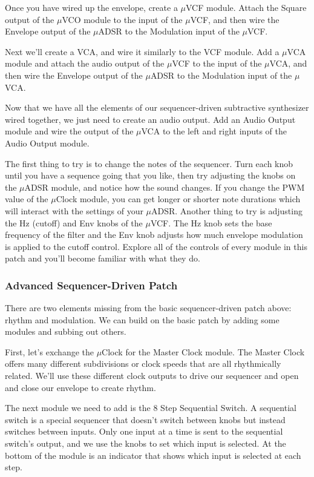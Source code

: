 \documentclass[11pt]{book}
\begin{document}
\begin{multicols*}{2}
Once you have wired up the envelope, create a $\mu$VCF module. Attach the Square output of the $\mu$VCO module to the input of the $\mu$VCF, and then wire the Envelope output of the $\mu$ADSR to the Modulation input of the $\mu$VCF.

Next we'll create a VCA, and wire it similarly to the VCF module. Add a $\mu$VCA module and attach the audio output of the $\mu$VCF to the input of the $\mu$VCA, and then wire the Envelope output of the $\mu$ADSR to the Modulation input of the $\mu$VCA.

Now that we have all the elements of our sequencer-driven subtractive synthesizer wired together, we just need to create an audio output. Add an Audio Output module and wire the output of the $\mu$VCA to the left and right inputs of the Audio Output module.

The first thing to try is to change the notes of the sequencer. Turn each knob until you have a sequence going that you like, then try adjusting the knobs on the $\mu$ADSR module, and notice how the sound changes. If you change the PWM value of the $\mu$Clock module, you can get longer or shorter note durations which will interact with the settings of your $\mu$ADSR. Another thing to try is adjusting the Hz (cutoff) and Env knobs of the $\mu$VCF. The Hz knob sets the base frequency of the filter and the Env knob adjusts how much envelope modulation is applied to the cutoff control. Explore all of the controls of every module in this patch and you'll become familiar with what they do.

\subsubsection{Advanced Sequencer-Driven Patch}

There are two elements missing from the basic sequencer-driven patch above: rhythm and modulation. We can build on the basic patch by adding some modules and subbing out others.

First, let's exchange the $\mu$Clock for the Master Clock module. The Master Clock offers many different subdivisions or clock speeds that are all rhythmically related. We'll use these different clock outputs to drive our sequencer and open and close our envelope to create rhythm.

The next module we need to add is the 8 Step Sequential Switch. A sequential switch is a special sequencer that doesn't switch between knobs but instead switches between inputs. Only one input at a time is sent to the sequential switch's output, and we use the knobs to set which input is selected. At the bottom of the module is an indicator that shows which input is selected at each step.


\end{multicols*}
\end{document}
